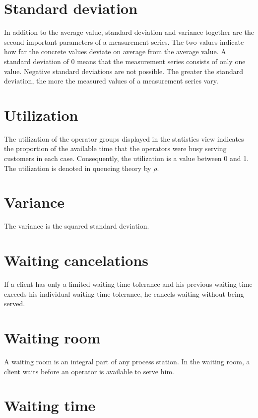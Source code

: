 \section*{Standard deviation}


In addition to the average value,
standard deviation and variance together are the second important parameters
of a measurement series. The two values indicate how far the concrete values
deviate on average from the average value. A standard deviation of 0 means
that the measurement series consists of only one value. Negative standard
deviations are not possible. The greater the standard deviation, the more
the measured values of a measurement series vary.

\section*{Utilization}


The utilization of the operator groups displayed in the statistics view indicates the proportion
of the available time that the operators were busy serving customers in each case. Consequently, the utilization is a value between
0 and 1. The utilization is denoted in queueing theory by $\rho$.

\section*{Variance}


The variance is the squared standard deviation.

\section*{Waiting cancelations}


If a client has only a limited waiting time tolerance and his previous waiting time exceeds his
individual waiting time tolerance, he cancels waiting without being served.

\section*{Waiting room}


A waiting room is an integral part of any process station.
In the waiting room, a client waits before an operator is available to serve him.

\section*{Waiting time}


